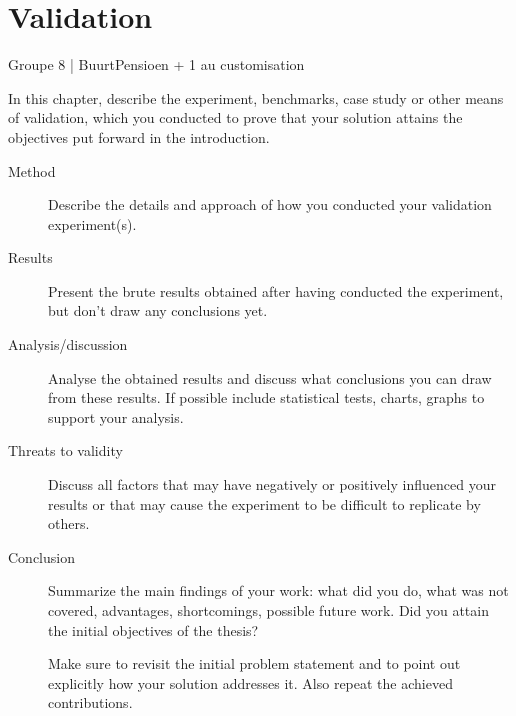 \section{Validation}

Groupe 8 | BuurtPensioen + 1 au customisation 

In this chapter, describe the experiment, benchmarks, case study or
other means of validation, which you conducted to prove that your
solution attains the objectives put forward in the introduction.

\begin{description}

\item[Method] Describe the details and approach of how you conducted
  your validation experiment(s).

\item[Results] Present the brute results obtained after having
  conducted the experiment, but don’t draw any conclusions yet.

\item[Analysis/discussion] Analyse the obtained results and discuss
  what conclusions you can draw from these results. If possible
  include statistical tests, charts, graphs to support your analysis.

\item[Threats to validity] Discuss all factors that may have
  negatively or positively influenced your results or that may cause
  the experiment to be difficult to replicate by others.

\item[Conclusion] Summarize the main findings of your work: what did
  you do, what was not covered, advantages, shortcomings, possible
  future work. Did you attain the initial objectives of the thesis?

  Make sure to revisit the initial problem statement and to point out
  explicitly how your solution addresses it. Also repeat the achieved
  contributions.

\end{description}